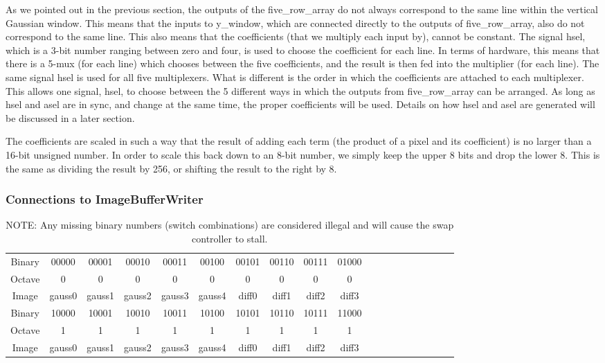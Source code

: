 As we pointed out in the previous section, the outputs of the five\_row\_array do 
not always correspond to the same line within the vertical Gaussian window. This 
means that the inputs to y\_window, which are connected directly to the outputs 
of five\_row\_array, also do not correspond to the same line. This also means that 
the coefficients (that we multiply each input by), cannot be constant. The 
signal hsel, which is a 3-bit number ranging between zero and four, is used to 
choose the coefficient for each line. In terms of hardware, this means that 
there is a 5-mux (for each line) which chooses between the five coefficients, 
and the result is then fed into the multiplier (for each line). The same signal 
hsel is used for all five multiplexers. What is different is the order in which 
the coefficients are attached to each multiplexer. This allows one signal, hsel, 
to choose between the 5 different ways in which the outputs from five\_row\_array 
can be arranged. As long as hsel and asel are in sync, and change at the same 
time, the proper coefficients will be used. Details on how hsel and asel are 
generated will be discussed in a later section.

The coefficients are scaled in such a way that the result of adding each term 
(the product of a pixel and its coefficient) is no larger than a 16-bit unsigned 
number. In order to scale this back down to an 8-bit number, we simply keep the 
upper 8 bits and drop the lower 8. This is the same as dividing the result by 
256, or shifting the result to the right by 8.

\subsubsection{Connections to ImageBufferWriter}

\begin{table}


    \begingroup
    \tiny
    \caption{ NOTE: Any missing binary numbers (switch combinations) are considered illegal 
and will cause the swap controller to stall.} \label{wrap-tab:1} 
\begin{tabular}{ c | c | c | c | c | c | c | c | c | c | c | c | c | c | c | c | c | c | c } 
Binary & 00000 & 00001 & 00010 & 00011 & 00100 & 00101 & 00110 & 00111 & 01000 \\ 
Octave & 0 & 0 & 0 & 0 & 0 & 0 & 0 & 0 & 0 \\
Image & gauss0 & gauss1 & gauss2 & gauss3 & gauss4 & diff0 & diff1 & diff2 & diff3 \\ \toprule
Binary & 10000 & 10001 & 10010 & 10011 & 10100 & 10101 & 10110 & 10111 & 11000 \\
Octave & 1 & 1 & 1 & 1 & 1 & 1 & 1 & 1 & 1 \\
Image & gauss0 & gauss1 & gauss2 & gauss3 & gauss4 & diff0 & diff1 & diff2 & diff3 \\
\end{tabular}
\endgroup 
\end{table}


